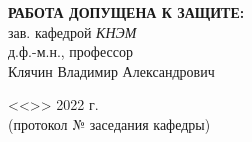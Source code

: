 \begin{center}
\vspace{0pt plus1fill} %

\hfill\begin{minipage}{0.55\textwidth}
			\textbf{РАБОТА ДОПУЩЕНА К ЗАЩИТЕ:} \\
			зав. кафедрой \textit{КНЭМ} \\
			д.ф.-м.н., профессор \\
			Клячин Владимир Александрович \\
			\underline{\hspace{\textwidth}}
		\end{minipage}
%

\vspace{0pt plus2fill} %

\hfill\begin{minipage}{0.55\textwidth}
			<<\underline{\hspace{1cm}}>> \underline{\hspace{3cm}} 2022 г. \\
			(протокол № \underline{\hspace{1cm}} заседания кафедры)
		\end{minipage}
%

\vspace{0pt plus4fill} %
\end{center}
%
{\centering\textbf{\thesisCity}\  \textbf{\thesisYear}\par}